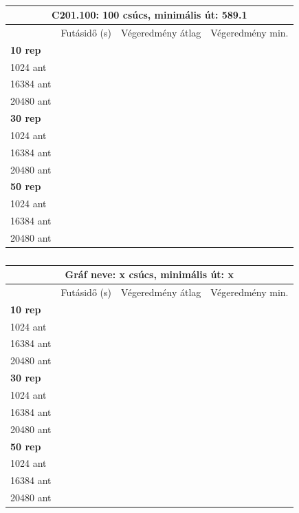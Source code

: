 \begin{table}[ht!]
	\centering
	\begin{tabular}{|p{2cm}||p{3cm}|p{3.5cm}|p{3.5cm}|}
		\hline
		\multicolumn{4}{|c|}{C201.100: 100 csúcs, minimális út: 589.1} \\
		\hline
		& Futásidő (s) & Végeredmény átlag & Végeredmény min.\\
		\hline
		\textbf{10 rep} & & & \\
		1024 ant &  &  &  \\
		16384 ant &  &  &  \\
		20480 ant &  &  &  \\
		\hline
		\textbf{30 rep} &  &  &  \\
		1024 ant &  &  &  \\
		16384 ant & &  &  \\
		20480 ant &  &  & \\
		\hline
		\textbf{50 rep} &  &  &  \\
		1024 ant &  &  &  \\
		16384 ant &  &  &  \\
		20480 ant &  &  &  \\
		\hline
	\end{tabular}
	\caption{}
	\label{table:VRTPW_100_2}
\end{table}

\begin{table}[ht!]
	\centering
	\begin{tabular}{|p{2cm}||p{3cm}|p{3.5cm}|p{3.5cm}|}
		\hline
		\multicolumn{4}{|c|}{Gráf neve: x csúcs, minimális út: x} \\
		\hline
		& Futásidő (s) & Végeredmény átlag & Végeredmény min.\\
		\hline
		\textbf{10 rep} & & & \\
		1024 ant &  &  &  \\
		16384 ant &  &  &  \\
		20480 ant &  &  &  \\
		\hline
		\textbf{30 rep} &  &  &  \\
		1024 ant &  &  &  \\
		16384 ant & &  &  \\
		20480 ant &  &  & \\
		\hline
		\textbf{50 rep} &  &  &  \\
		1024 ant &  &  &  \\
		16384 ant &  &  &  \\
		20480 ant &  &  &  \\
		\hline
	\end{tabular}
	\caption{}
	\label{table:VRTPW_empty}
\end{table}



